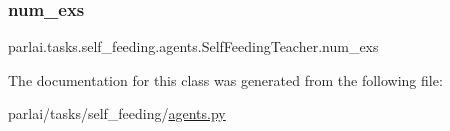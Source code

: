 \subsubsection{\texorpdfstring{num\+\_\+exs}{num\_exs}}
{\footnotesize\ttfamily parlai.\+tasks.\+self\+\_\+feeding.\+agents.\+Self\+Feeding\+Teacher.\+num\+\_\+exs}



The documentation for this class was generated from the following file\+:\begin{DoxyCompactItemize}
\item 
parlai/tasks/self\+\_\+feeding/\hyperlink{parlai_2tasks_2self__feeding_2agents_8py}{agents.\+py}\end{DoxyCompactItemize}
